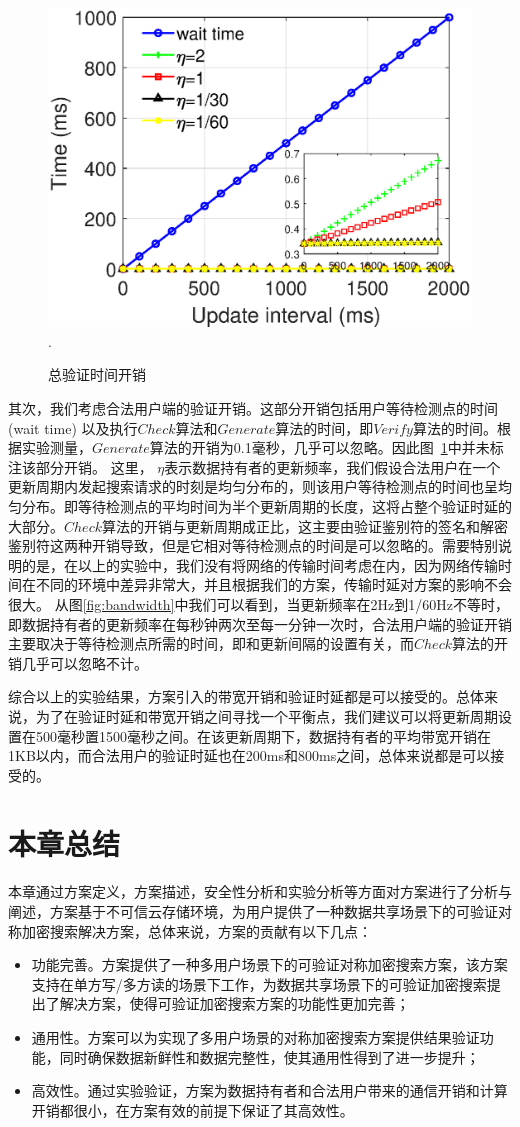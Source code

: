 \begin{figure}[h]
\centering
\includegraphics[width=3.5 in]{expr/verify-2}
\DeclareGraphicsExtensions.
\caption{总验证时间开销}
\label{fig:verify-2}
\end{figure}
其次，我们考虑合法用户端的验证开销。这部分开销包括用户等待检测点的时间 (wait time) 以及执行$Check$算法和$Generate$算法的时间，即$Verify$算法的时间。根据实验测量，$Generate$算法的开销为0.1毫秒，几乎可以忽略。因此图~\ref{fig:verify-2}中并未标注该部分开销。
这里， $\eta$表示数据持有者的更新频率，我们假设合法用户在一个更新周期内发起搜索请求的时刻是均匀分布的，则该用户等待检测点的时间也呈均匀分布。即等待检测点的平均时间为半个更新周期的长度，这将占整个验证时延的大部分。$Check$算法的开销与更新周期成正比，这主要由验证鉴别符的签名和解密鉴别符这两种开销导致，但是它相对等待检测点的时间是可以忽略的。需要特别说明的是，在以上的实验中，我们没有将网络的传输时间考虑在内，因为网络传输时间在不同的环境中差异非常大，并且根据我们的方案，传输时延对方案的影响不会很大。
从图\ref{fig:bandwidth}中我们可以看到，当更新频率在2Hz到1/60Hz不等时，即数据持有者的更新频率在每秒钟两次至每一分钟一次时，合法用户端的验证开销主要取决于等待检测点所需的时间，即和更新间隔的设置有关，而$Check$算法的开销几乎可以忽略不计。

综合以上的实验结果，\multi 方案引入的带宽开销和验证时延都是可以接受的。总体来说，为了在验证时延和带宽开销之间寻找一个平衡点，我们建议可以将更新周期设置在500毫秒置1500毫秒之间。在该更新周期下，数据持有者的平均带宽开销在1KB以内，而合法用户的验证时延也在200ms和800ms之间，总体来说都是可以接受的。

\section{本章总结}
本章通过方案定义，方案描述，安全性分析和实验分析等方面对\multi 方案进行了分析与阐述，\multi 方案基于不可信云存储环境，为用户提供了一种数据共享场景下的可验证对称加密搜索解决方案，总体来说，\multi 方案的贡献有以下几点：
\begin{itemize}
  \item 功能完善。\multi 方案提供了一种多用户场景下的可验证对称加密搜索方案，该方案支持在单方写/多方读的场景下工作，为数据共享场景下的可验证加密搜索提出了解决方案，使得可验证加密搜索方案的功能性更加完善；
  \item 通用性。\multi 方案可以为实现了多用户场景的对称加密搜索方案提供结果验证功能，同时确保数据新鲜性和数据完整性，使其通用性得到了进一步提升；
  \item 高效性。通过实验验证，\multi 方案为数据持有者和合法用户带来的通信开销和计算开销都很小，在方案有效的前提下保证了其高效性。
\end{itemize}

